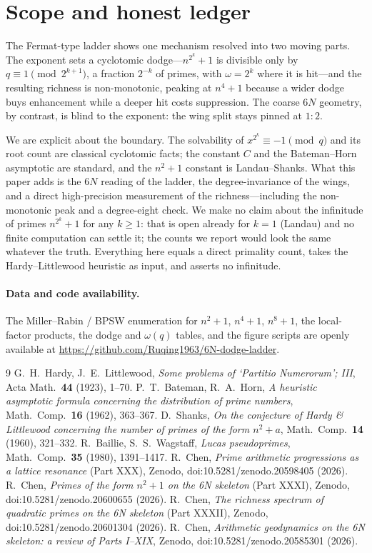 \documentclass[11pt]{article}
\theoremstyle{definition}
\begin{document}
\FloatBarrier
\section{Scope and honest ledger}
The Fermat-type ladder shows one mechanism resolved into two moving parts. The exponent sets a
cyclotomic dodge---$n^{2^k}+1$ is divisible only by $q\equiv1\pmod{2^{k+1}}$, a fraction $2^{-k}$ of
primes, with $\omega=2^k$ where it is hit---and the resulting richness is non-monotonic, peaking at
$n^4+1$ because a wider dodge buys enhancement while a deeper hit costs suppression. The coarse $6N$
geometry, by contrast, is blind to the exponent: the wing split stays pinned at $1{:}2$.

We are explicit about the boundary. The solvability of $x^{2^k}\equiv-1\pmod q$ and its root count are
classical cyclotomic facts; the constant $C$ and the Bateman--Horn asymptotic are standard, and the
$n^2+1$ constant is Landau--Shanks. What this paper adds is the $6N$ reading of the ladder, the
degree-invariance of the wings, and a direct high-precision measurement of the richness---including the
non-monotonic peak and a degree-eight check. We make no claim about the infinitude of primes
$n^{2^k}+1$ for any $k\ge1$: that is open already for $k=1$ (Landau) and no finite computation can
settle it; the counts we report would look the same whatever the truth. Everything here equals a
direct primality count, takes the Hardy--Littlewood heuristic as input, and asserts no infinitude.

\paragraph{Data and code availability.} The Miller--Rabin / BPSW enumeration for $n^2+1$, $n^4+1$,
$n^8+1$, the local-factor products, the dodge and $\omega(q)$ tables, and the figure scripts are openly
available at \url{https://github.com/Ruqing1963/6N-dodge-ladder}.

\begin{thebibliography}{9}
 G.~H.~Hardy, J.~E.~Littlewood, \emph{Some problems of `Partitio Numerorum'; III}, Acta Math.\ \textbf{44} (1923), 1--70.
 P.~T.~Bateman, R.~A.~Horn, \emph{A heuristic asymptotic formula concerning the distribution of prime numbers}, Math.\ Comp.\ \textbf{16} (1962), 363--367.
 D.~Shanks, \emph{On the conjecture of Hardy \& Littlewood concerning the number of primes of the form $n^2+a$}, Math.\ Comp.\ \textbf{14} (1960), 321--332.
 R.~Baillie, S.~S.~Wagstaff, \emph{Lucas pseudoprimes}, Math.\ Comp.\ \textbf{35} (1980), 1391--1417.
 R.~Chen, \emph{Prime arithmetic progressions as a lattice resonance} (Part XXX), Zenodo, doi:10.5281/zenodo.20598405 (2026).
 R.~Chen, \emph{Primes of the form $n^2+1$ on the 6N skeleton} (Part XXXI), Zenodo, doi:10.5281/zenodo.20600655 (2026).
 R.~Chen, \emph{The richness spectrum of quadratic primes on the 6N skeleton} (Part XXXII), Zenodo, doi:10.5281/zenodo.20601304 (2026).
 R.~Chen, \emph{Arithmetic geodynamics on the 6N skeleton: a review of Parts I--XIX}, Zenodo, doi:10.5281/zenodo.20585301 (2026).
\end{thebibliography}
\end{document}
